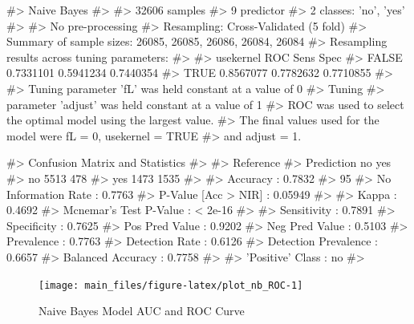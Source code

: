 \begin{Schunk}
\begin{Soutput}
#> Naive Bayes 
#> 
#> 32606 samples
#>     9 predictor
#>     2 classes: 'no', 'yes' 
#> 
#> No pre-processing
#> Resampling: Cross-Validated (5 fold) 
#> Summary of sample sizes: 26085, 26085, 26086, 26084, 26084 
#> Resampling results across tuning parameters:
#> 
#>   usekernel  ROC        Sens       Spec     
#>   FALSE      0.7331101  0.5941234  0.7440354
#>    TRUE      0.8567077  0.7782632  0.7710855
#> 
#> Tuning parameter 'fL' was held constant at a value of 0
#> Tuning
#>  parameter 'adjust' was held constant at a value of 1
#> ROC was used to select the optimal model using the largest value.
#> The final values used for the model were fL = 0, usekernel = TRUE
#>  and adjust = 1.
\end{Soutput}
\end{Schunk}

\begin{Schunk}
\begin{Soutput}
#> Confusion Matrix and Statistics
#> 
#>           Reference
#> Prediction   no  yes
#>        no  5513  478
#>        yes 1473 1535
#>                                           
#>                Accuracy : 0.7832          
#>                  95%
#>     No Information Rate : 0.7763          
#>     P-Value [Acc > NIR] : 0.05949         
#>                                           
#>                   Kappa : 0.4692          
#>  Mcnemar's Test P-Value : < 2e-16         
#>                                           
#>             Sensitivity : 0.7891          
#>             Specificity : 0.7625          
#>          Pos Pred Value : 0.9202          
#>          Neg Pred Value : 0.5103          
#>              Prevalence : 0.7763          
#>          Detection Rate : 0.6126          
#>    Detection Prevalence : 0.6657          
#>       Balanced Accuracy : 0.7758          
#>                                           
#>        'Positive' Class : no              
#> 
\end{Soutput}
\end{Schunk}

\begin{Schunk}
\begin{figure}[H]

{\centering \texttt{[image: main\_files/figure-latex/plot\_nb\_ROC-1]} 

}

\caption[Naive Bayes Model AUC and ROC Curve]{Naive Bayes Model AUC and ROC Curve}\label{fig:plot_nb_ROC}
\end{figure}
\end{Schunk}

